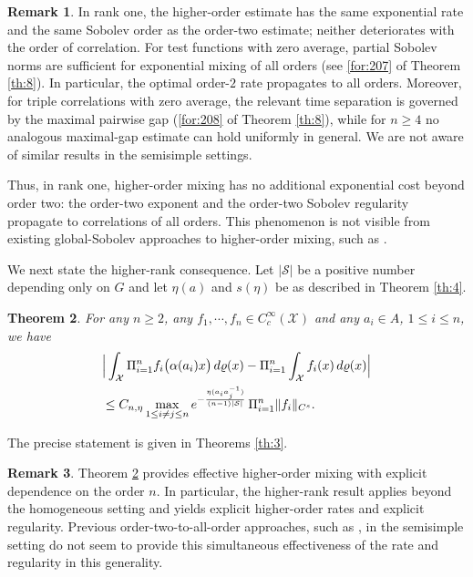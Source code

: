 \documentclass[11 pt]{amsart}
\newcommand{\norm}[1]{\lVert#1\rVert}
\newtheorem{theorem}{Theorem}[section]
\theoremstyle{definition}
\newtheorem{remark}[theorem]{Remark}
\numberwithin{equation}{section}
\begin{document}
\begin{remark} In rank one, the higher-order estimate has the same exponential rate
and the same Sobolev order as the order-two estimate; neither
deteriorates with the order of correlation. For test functions with zero average, partial Sobolev norms are sufficient for exponential mixing of all orders (see \eqref{for:207} of Theorem \ref{th:8}). In particular, the optimal order-$2$ rate propagates to all orders. Moreover, for triple correlations with zero average, the relevant time separation is governed by the maximal pairwise gap (\eqref{for:208} of Theorem \ref{th:8}),  while for \(n\ge4\) no analogous maximal-gap estimate can hold uniformly in general.
We are not aware of similar results in the semisimple settings.

Thus, in rank one, higher-order mixing has no additional exponential
cost beyond order two: the order-two exponent and the order-two Sobolev
regularity propagate to correlations of all orders.  This phenomenon is
not visible from existing global-Sobolev approaches to higher-order
mixing, such as \cite{BEG}. 

\end{remark}

We next state the higher-rank consequence.   Let $|\mathcal{S}|$ be a positive number depending only  on $G$ and let $\eta(a)$ and $s(\eta)$ be as described in Theorem \ref{th:4}.




\begin{theorem}\label{th:16}  For any $n\geq2$, any $f_1,\cdots, f_n\in C_c^\infty(\mathcal{X})$ and any $a_i\in A$, $1\leq i\leq n$, we have
\begin{align*}
 &\Big|\int_{\mathcal{X}} \Pi_{i=1}^{n} f_i\big(\alpha(a_i)x\big) \, d\varrho(x) - \Pi_{i=1}^{n} \int_{\mathcal{X}} f_i(x) \, d\varrho(x)\Big|\notag\\
&\leq C_{n,\eta} \max_{1\le i\neq j\le n} e^{-\frac{\eta(a_ia_j^{-1})}{(n-1)|\mathcal{S}|}}\,\Pi_{i=1}^n\norm{f_i}_{C^{s}}.
\end{align*}

\end{theorem}
The precise statement is given in Theorems \ref{th:3}.

 \begin{remark} Theorem \ref{th:16} provides effective higher-order mixing with explicit dependence on the order \(n\). In particular, the higher-rank result applies beyond the homogeneous setting and yields explicit higher-order rates and explicit regularity. Previous
order-two-to-all-order approaches, such as \cite{BEG},  in the semisimple setting do not seem
to provide this simultaneous effectiveness of the rate and regularity
in this generality.

\end{remark}
\end{document}
